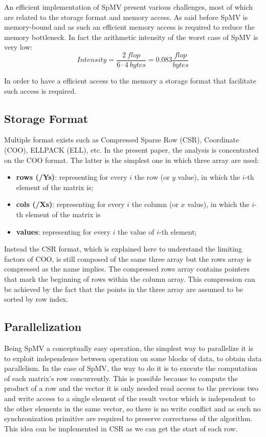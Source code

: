 \documentclass[conference]{IEEEtran}
\newcommand{\torem}[1]{\color{olive} #1 \color{black}}
\begin{document}
An efficient implementation of SpMV present various challenges, most of which are related to the storage format and memory access. As said before SpMV is memory-bound and as such an efficient memory access is required to reduce the memory bottleneck. In fact the arithmetic intensity of the worst case of SpMV is very low:
\[Intensity = \frac{2\ flop}{6 \cdot 4\ bytes} = 0.083\frac {flop}{bytes}\]

In order to have a efficient access to the memory a storage format that facilitate such access is required.

\subsection{Storage Format}

Multiple format exists such as Compressed Sparse Row (CSR), Coordinate (COO), ELLPACK (ELL), etc. In the present paper, the analysis is concentrated on the COO format. The latter is the simplest one in which three array are used:

\begin{itemize}
	\item \textbf{rows (/Ys)}: representing for every $i$ the row (or $y$ value), in which the $i$-th element of the matrix is;
	\item \textbf{cols (/Xs)}: representing for every $i$ the column (or $x$ value), in which the $i$-th element of the matrix is
	\item \textbf{values}: representing for every $i$ the value of $i$-th element;
\end{itemize}

Instead the CSR format, which is explained here to understand the limiting factors of COO, is still composed of the same three array but the rows array is compressed as the name implies. The compressed rows array contains pointers that mark the beginning of rows within the column array. This compression can be achieved by the fact that the points in the three array are assumed to be sorted by row index.

\subsection{Parallelization}
Being SpMV a conceptually easy operation, the simplest way to parallelize it is to exploit independence between operation on some blocks of data, to obtain data parallelism. In the case of SpMV, the way to do it is to execute the computation of each matrix's row concurrently. This is possible because to compute the product of a row and the vector it is only needed read access to the previous two and write access to a single element of the result vector which is independent to the other elements in the same vector, so there is no write conflict and as such no synchronization primitive are required to preserve correctness of the algorithm. This idea can be implemented in CSR as we can get the start of each row.
\end{document}
